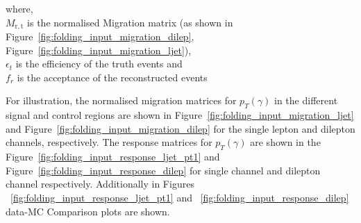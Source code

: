 where, \\
$M_{\mathrm{r,t}}$ is the normalised Migration matrix (as shown in Figure~\ref{fig:folding_input_migration_dilep}, Figure~\ref{fig:folding_input_migration_ljet}),\\
$\epsilon_{t}$ is the efficiency of the truth events and \\
$f_{r}$ is the acceptance of the reconstructed events

\vspace*{20pt}

For illustration, the normalised migration matrices for $p_T(\gamma)$ in the different signal and control regions are shown in Figure~\ref{fig:folding_input_migration_ljet} and Figure~\ref{fig:folding_input_migration_dilep} for the single lepton and dilepton channels, respectively. The response matrices for $p_T(\gamma)$  are shown in the Figure~\ref{fig:folding_input_response_ljet_pt1} and Figure~\ref{fig:folding_input_response_dilep} for single channel and dilepton channel respectively. Additionally in Figures ~\ref{fig:folding_input_response_ljet_pt1} and ~\ref{fig:folding_input_response_dilep} data-MC Comparison plots are shown. 





